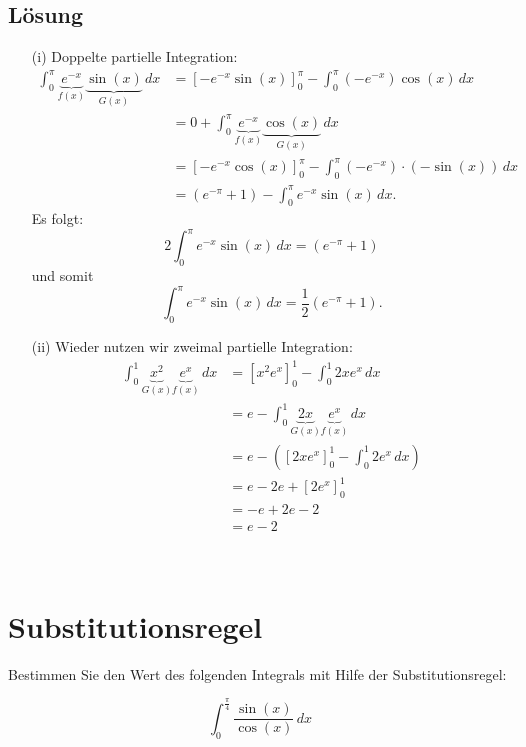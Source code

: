 \subsection*{Lösung}
\begin{itemize}
\item[(i)] Doppelte partielle Integration:
		\begin{align*}
			\int_0^{\pi} \underbrace{e^{-x}}_{f(x)} \underbrace{\sin(x)}_{G(x)}\, dx
				&=  [-e^{-x}\sin(x) ]_0^{\pi} - \int_0^{\pi}(-e^{-x})\cos(x)\, dx					\\
				&=  0 + \int_0^{\pi}\underbrace{e^{-x}}_{f(x)}\underbrace{\cos(x)}_{G(x)}\, dx	\\
				&= [-e^{-x}\cos(x)]_0^{\pi} - \int_0^{\pi} (-e^{-x})\cdot(-\sin(x))\, dx			\\
				&= (e^{-\pi} + 1) - \int_0^{\pi} e^{-x}\sin(x)\, dx.
		\end{align*}
		Es folgt:
		$$
			2\int_0^{\pi} e^{-x}\sin(x)\, dx =  (e^{-\pi} + 1) 
		$$
		und somit
		$$
			\int_0^{\pi} e^{-x}\sin(x)\, dx =  \frac{1}{2}(e^{-\pi} + 1).
		$$		
\item[(ii)] Wieder nutzen wir zweimal partielle Integration:
		\begin{align*}
		\int_0^1 \underbrace{x^2}_{G(x)}\underbrace{e^{x}}_{f(x)} \, dx
				&=[x^2e^x]_0^1 - \int_0^1 2xe^x \, dx\\
				&=e - \int_0^1 \underbrace{2x}_{G(x)}\underbrace{e^x}_{f(x)} \, dx\\
				&=e- \left([2xe^x]_0^1 - \int_0^1 2e^x \, dx\right)\\
				&= e - 2e + [2e^x]_0^1\\
				&=-e+2e-2\\
				&=e-2
		\end{align*}
\end{itemize}
\quad\\[10mm]
\section{Substitutionsregel}
Bestimmen Sie den Wert des folgenden Integrals mit Hilfe der Substitutionsregel:

		$$
			\int_0^{\frac{\pi}{4}} \frac{\sin(x)}{\cos(x)}\, dx
		$$

